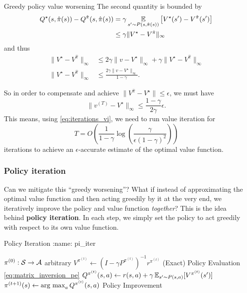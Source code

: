 \documentclass[\main/main]{subfiles}
\begin{document}
\begin{theorem}{Greedy policy value worsening}
    The second quantity is bounded by
    \begin{align*}
        Q^{\star}(s, \hat \pi(s)) - Q^{\hat \pi}(s, \hat \pi(s))
        &=
        \gamma \operatorname*{\mathbb{E}}_{s'\sim P(s, \hat \pi(s))}\left[ V^\star(s') - V^{\hat \pi}(s') \right] \\
        & \leq 
        \gamma \|V^{\star} - V^{\hat \pi}\|_\infty
    \end{align*}
    and thus
    \begin{align*}
        \|V^\star - V^{\hat \pi}\|_\infty &\le 2 \gamma \|v - V^{\star}\|_{\infty} + \gamma \|V^{\star} - V^{\hat \pi}\|_\infty \\
        \|V^\star - V^{\hat \pi}\|_\infty &\le \frac{2 \gamma \|v - V^{\star}\|_{\infty}}{1-\gamma}.
    \end{align*}
\end{theorem}

So in order to compensate and achieve $\|V^{\hat \pi} - V^{\star}\| \le \epsilon$, we must have
\[
    \|v^{(T)} - V^\star\|_{\infty} \le \frac{1-\gamma}{2 \gamma} \epsilon.
\]
This means, using \eqref{eq:iterations_vi}, we need to run value iteration for
\[
    T = O\left( \frac{1}{1-\gamma} \log\left(\frac{\gamma}{\epsilon (1-\gamma)^2}\right) \right)
\]
iterations to achieve an $\epsilon$-accurate estimate of the optimal value function.

\subsubsection{Policy iteration}

Can we mitigate this ``greedy worsening''? What if instead of approximating the optimal value function and then acting greedily by it at the very end, we iteratively improve the policy and value function \emph{together}? This is the idea behind \textbf{policy iteration}. In each step, we simply set the policy to act greedily with respect to its own value function.

\begin{definition}{Policy Iteration}
:name: pi_iter

\begin{algorithmic}
\State $\pi^{(0)} : \mathcal{S} \to \mathcal{A}$ arbitrary
    \State $V^{\pi^{(t)}} \gets (I - \gamma P^{\pi^{(t)}})^{-1} r^{\pi^{(t)}}$
    \Comment (Exact) Policy Evaluation \eqref{eq:matrix_inversion_pe}
    \State $Q^{\pi^{(t)}}(s, a) \gets r(s, a) + \gamma \operatorname*{\mathbb{E}}_{s' \sim P(s, a)} [V^{\pi^{(t)}} (s')]$
    \State $\pi^{(t+1)}(s) \gets \operatorname*{\textrm{arg\ max}}_a Q^{\pi^{(t)}} (s, a)$
    \Comment Policy Improvement
\EndFor
\end{algorithmic}
\end{definition}
\end{document}
